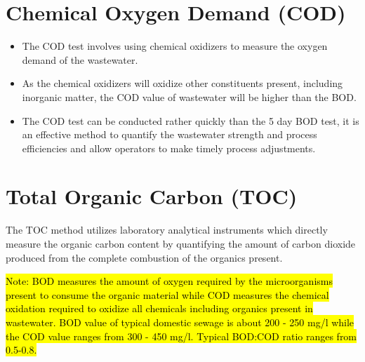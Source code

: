 \begin{itemize}
			    \section{Chemical Oxygen Demand (COD)}
			      	\begin{itemize}
			      		\item The COD test involves using chemical oxidizers to measure the oxygen demand of the wastewater.
			      		\item As the chemical oxidizers will oxidize other constituents present, including inorganic matter, the COD value of wastewater will be higher than the BOD.  
			      		\item The COD test can be conducted rather quickly than the 5 day BOD test, it is an effective method to quantify the wastewater strength and process efficiencies and allow operators to make timely process adjustments.
			      	\end{itemize}

			    \section{Total Organic Carbon (TOC)}
			      	The TOC method utilizes laboratory analytical instruments which directly measure the organic carbon content by quantifying the amount of carbon dioxide produced from the complete combustion of the organics present.
		\end{itemize}
		
		
		
			\hl{Note: BOD measures the amount of oxygen required by the microorganisms present to consume the organic material while COD measures the chemical oxidation required to oxidize all chemicals including organics present in wastewater.  BOD value of typical domestic sewage is about 200 - 250 mg/l while the COD value ranges from 300 - 450 mg/l.  Typical BOD:COD ratio ranges from 0.5-0.8.}\\
		
